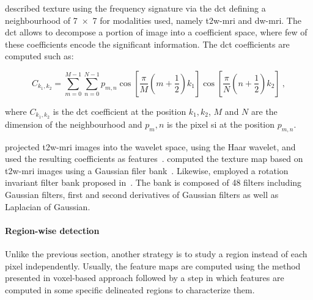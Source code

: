\citeauthor{Chan2003} described texture using the frequency signature via the \acf{dct}\cite{Ahmed1974} defining a neighbourhood of \SI[product-units=repeat]{7x7}{\px} for modalities used, namely \ac{t2w}-\ac{mri} and \ac{dw}-\ac{mri}.
The \ac{dct} allows to decompose a portion of image into a coefficient space, where few of these coefficients encode the significant information.
The \ac{dct} coefficients are computed such as:

\begin{equation}
	C_{k_1,k_2} = \sum_{m=0}^{M-1} \sum_{n=0}^{N-1} p_{m,n} \cos \left[ \frac{\pi}{M} \left( m + \frac{1}{2} \right) k_1 \right] \cos \left[ \frac{\pi}{N} \left( n + \frac{1}{2} \right) k_2 \right] \ ,
\end{equation}

\noindent where $C_{k_1,k_2}$ is the \ac{dct} coefficient at the position $k_1,k_2$, $M$ and $N$ are the dimension of the neighbourhood and $p_m,n$ is the pixel \ac{si} at the position $p_{m,n}$.

\citeauthor{Viswanath2012} projected \ac{t2w}-\ac{mri} images into the wavelet space, using the Haar wavelet, and used the resulting coefficients as features~\cite{Viswanath2012}.
\citeauthor{Litjens2011} computed the texture map based on \ac{t2w}-\ac{mri} images using a Gaussian filer bank~\cite{Litjens2011}.
Likewise, \citeauthor{rampun2016computer} employed a rotation invariant filter bank proposed in~\cite{leung2001representing}.
The bank is composed of 48 filters including Gaussian filters, first and second derivatives of Gaussian filters as well as Laplacian of Gaussian.


\paragraph{Region-wise detection}

Unlike the previous section, another strategy is to study a region instead of each pixel independently.
Usually, the feature maps are computed using the method presented in voxel-based approach followed by a step in which features are computed in some specific delineated regions to characterize them.

